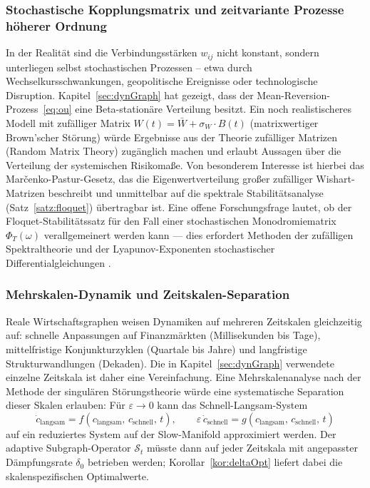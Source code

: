 \documentclass[a4paper, 12pt, twoside, openright]{report}
\theoremstyle{definition}
\theoremstyle{definition}
\begin{document}
\subsubsection{Stochastische Kopplungsmatrix und zeitvariante Prozesse höherer Ordnung}

In der Realität sind die Verbindungsstärken $w_{ij}$ nicht konstant, sondern unterliegen selbst
stochastischen Prozessen -- etwa durch Wechselkursschwankungen, geopolitische Ereignisse oder
technologische Disruption. Kapitel~\ref{sec:dynGraph} hat gezeigt, dass der
Mean-Reversion-Prozess~\eqref{eq:ou} eine Beta-stationäre Verteilung besitzt. Ein noch
realistischeres Modell mit zufälliger Matrix $W(t) = \bar{W} + \sigma_W \cdot B(t)$
(matrixwertiger Brown'scher Störung) würde Ergebnisse aus der Theorie zufälliger Matrizen
(Random Matrix Theory) \citep{mehta2004random} zugänglich machen und erlaubt Aussagen über
die Verteilung der systemischen Risikomaße. Von besonderem Interesse ist hierbei das
Mar\v{c}enko-Pastur-Gesetz, das die Eigenwertverteilung großer zufälliger Wishart-Matrizen
beschreibt und unmittelbar auf die spektrale Stabilitätsanalyse (Satz~\ref{satz:floquet})
übertragbar ist. Eine offene Forschungsfrage lautet, ob der Floquet-Stabilitätssatz
für den Fall einer stochastischen Monodromiematrix $\Phi_T(\omega)$ verallgemeinert werden
kann --- dies erfordert Methoden der zufälligen Spektraltheorie und der Lyapunov-Exponenten
stochastischer Differentialgleichungen \citep{arnold1998random}.

\subsubsection{Mehrskalen-Dynamik und Zeitskalen-Separation}

Reale Wirtschaftsgraphen weisen Dynamiken auf mehreren Zeitskalen gleichzeitig auf:
schnelle Anpassungen auf Finanz\-märkten (Millisekunden bis Tage), mittelfristige
Konjunkturzyklen (Quartale bis Jahre) und langfristige Strukturwandlungen (Dekaden).
Die in Kapitel~\ref{sec:dynGraph} verwendete einzelne Zeitskala ist daher eine
Vereinfachung. Eine Mehr\-skalen\-analyse nach der Methode der singulären
Störungstheorie \citep{kokotovic1999singular} würde eine systematische Separation
dieser Skalen erlauben: Für $\varepsilon \to 0$ kann das Schnell-Langsam-System
\[
    \dot{c}_{\text{langsam}} = f(c_{\text{langsam}},\, c_{\text{schnell}},\, t),
    \qquad
    \varepsilon\,\dot{c}_{\text{schnell}} = g(c_{\text{langsam}},\, c_{\text{schnell}},\, t)
\]
auf ein reduziertes System auf der Slow-Manifold approximiert werden. Der adaptive
Subgraph-Operator $\mathcal{S}_t$ müsste dann auf jeder Zeitskala mit angepasster
Dämpfungsrate $\delta_0$ betrieben werden; Korollar~\ref{kor:deltaOpt} liefert
dabei die skalenspezifischen Optimalwerte.
\end{document}
